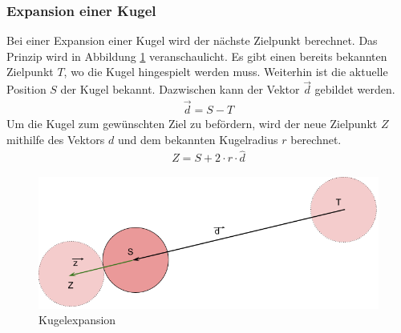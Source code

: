 \subsubsection{Expansion einer Kugel}
Bei einer Expansion einer Kugel wird der nächste Zielpunkt berechnet. Das Prinzip wird in Abbildung \ref{fig:kugelexpansion}
veranschaulicht. Es gibt einen bereits bekannten Zielpunkt $T$, wo die Kugel hingespielt werden muss.
Weiterhin ist die aktuelle Position $S$ der Kugel bekannt. Dazwischen kann der Vektor $\vec{d}$ gebildet werden.
\begin{align}
    \vec{d} = S - T
\end{align}
Um die Kugel zum gewünschten Ziel zu befördern, wird der neue Zielpunkt $Z$ mithilfe des Vektors $d$ und dem bekannten
Kugelradius $r$ berechnet.
\begin{align}
    Z = S + 2 \cdot r \cdot \hat{d}
\end{align}

\begin{figure}[h!]
    \begin{center}
        \includegraphics[width=0.5\linewidth]{../common/03_billiard_ai/resources/35_suchkandidat_kugel_expand.png}
    \end{center}
    \caption{Kugelexpansion}
    \label{fig:kugelexpansion}
\end{figure}

